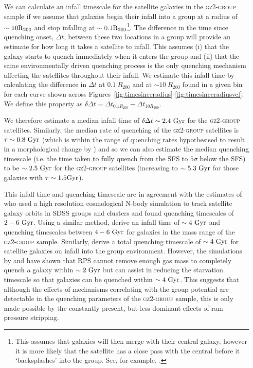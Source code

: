 \documentclass[useAMS,usenatbib]{mn2e}
\begin{document}
We can calculate an infall timescale for the satellite galaxies in the \textsc{gz2-group} sample if we assume that galaxies begin their infall into a group at a radius of $\sim10\rm{R}_{200}$ and stop infalling at $\sim0.1\rm{R}_{200}$\footnote{This assumes that galaxies will then merge with their central galaxy, however it is more likely that the satellite has a close pass with the central before it `backsplashes' into the group. See, for example, \cite{pimbblet11}.}. The difference in the time since quenching onset, $\Delta t$, between these two locations in a group will provide an estimate for how long it takes a satellite to infall. This assumes (i) that the galaxy starts to quench immediately when it enters the group and (ii) that the same environmentally driven quenching process is the only quenching mechanism affecting the satellites throughout their infall. We estimate this infall time by calculating the difference in $\Delta t$ at $0.1~R_{200}$ and at $\sim10~R_{200}$ found in a given bin for each curve shown across Figures~\ref{fig:timesinceradius}-\ref{fig:timesinceradiusvel}. We define this property as $\delta \Delta t = \Delta t_{0.1R_{200}} - \Delta t_{10R_{200}}$. 

We therefore estimate a median infall time of $\delta \Delta t \sim 2.4 ~\rm{Gyr}$ for the \textsc{gz2-group} satellites. Similarly, the median rate of quenching of the \textsc{gz2-group} satellites is $\tau \sim 0.8~\rm{Gyr}$ (which is within the range of quenching rates hypothesised to result in a morphological change by \citealt{smethurst15}) and so we can also estimate the median quenching timescale (i.e. the time taken to fully quench from the SFS to $5\sigma$ below the SFS) to be $\sim 2.5~\rm{Gyr}$ for the \textsc{gz2-group} satellites (increasing to $\sim 5.3~\rm{Gyr}$ for those galaxies with $\tau\sim1.5\rm{Gyr}$).

This infall time and quenching timescale are in agreement with the estimates of \cite{wetzel13} who used a high resolution cosmological N-body simulation to track satellite galaxy orbits in SDSS groups and clusters and found quenching timescales of $2-6~\rm{Gyr}$. Using a similar method, \cite{oman16} derive an infall time of $\sim4~\rm{Gyr}$ and quenching timescales between $4-6~\rm{Gyr}$ for galaxies in the mass range of the \textsc{gz2-group} sample. Similarly, \cite{hahn16} derive a total quenching timescale of $\sim4~\rm{Gyr}$ for satellite galaxies on infall into the group environment. However, the simulations by \cite{fillingham16} and \cite{emerick16} have shown that RPS cannot remove enough gas mass to completely quench a galaxy within $\sim2~\rm{Gyr}$ but can assist in reducing the starvation timescale so that galaxies can be quenched within $\sim4~\rm{Gyr}$. This suggests that although the effects of mechanisms correlating with the group potential are detectable in the quenching parameters of the \textsc{gz2-group} sample, this is only made possible by the constantly present, but less dominant effects of ram pressure stripping. 
\end{document}
